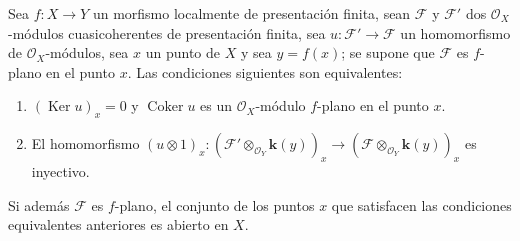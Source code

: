 \begin{proposition}[11.3.7]
\label{IV.11.3.7}
Sea $f:X\to Y$ un morfismo localmente de presentación finita, sean $\mathcal F$ y $\mathcal F'$ dos $\mathcal O_X$-módulos cuasicoherentes de presentación finita, sea $u:\mathcal F'\to\mathcal F$ un homomorfismo de $\mathcal O_X$-módulos, sea $x$ un punto de $X$ y sea $y=f(x)$; se supone que $\mathcal F$ es $f$-plano en el punto $x$. Las condiciones siguientes son equivalentes:
\begin{enumerate}[label=\emph{\alph*)}]
  \item $(\operatorname{Ker}u)_x=0$ y $\operatorname{Coker}u$ es un $\mathcal O_X$-módulo $f$-plano en el punto $x$.
  \item El homomorfismo $(u\otimes1)_x:(\mathcal F'\otimes_{\mathcal O_Y}\boldsymbol{k}(y))_x
\longrightarrow(\mathcal F\otimes_{\mathcal O_Y}\boldsymbol{k}(y))_x$ es inyectivo.
\end{enumerate}
Si además $\mathcal F$ es $f$-plano, el conjunto de los puntos $x$ que satisfacen las condiciones equivalentes anteriores es abierto en $X$.
\end{proposition}

